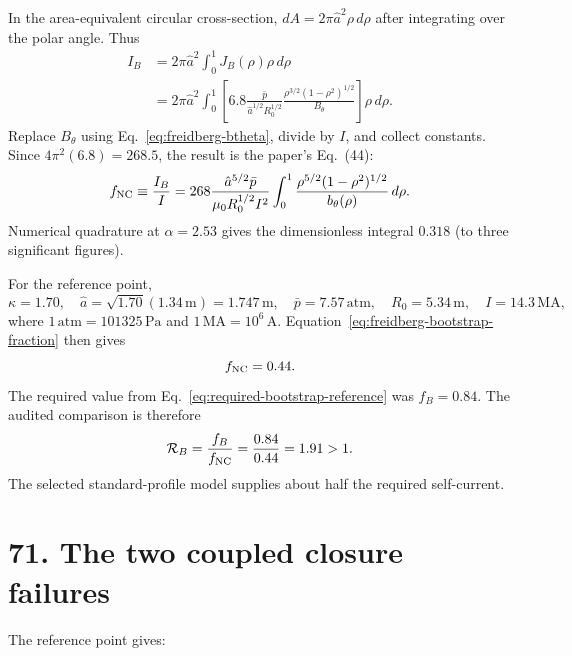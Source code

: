 \documentclass[11pt]{article}
\begin{document}
In the area-equivalent circular cross-section, $dA=2\pi\hat a^2\rho\,d\rho$ after
integrating over the polar angle. Thus
\begin{align}
 I_B&=2\pi\hat a^2\int_0^1J_B(\rho)\rho\,d\rho\\
 &=2\pi\hat a^2\int_0^1
 \left[6.8\frac{\bar p}{\hat a^{1/2}R_0^{1/2}}
 \frac{\rho^{3/2}(1-\rho^2)^{1/2}}{B_\theta}\right]\rho\,d\rho.
 \label{eq:bootstrap-area-integral}
\end{align}
Replace $B_\theta$ using Eq.~\eqref{eq:freidberg-btheta}, divide by $I$, and collect
constants. Since $4\pi^2(6.8)=268.5$, the result is the paper's Eq.~(44):
\begin{equation}
 f_{\rm NC}\equiv\frac{I_B}{I}
 =268\frac{\hat a^{5/2}\bar p}{\mu_0R_0^{1/2}I^2}
 \int_0^1\frac{\rho^{5/2}(1-\rho^2)^{1/2}}{b_\theta(\rho)}\,d\rho.
 \label{eq:freidberg-bootstrap-fraction}
\end{equation}
Numerical quadrature at $\alpha=2.53$ gives the dimensionless integral $0.318$
(to three significant figures).

For the reference point,
\begin{equation}
 \kappa=1.70,\quad \hat a=\sqrt{1.70}(1.34\,\mathrm m)=1.747\,\mathrm m,
 \quad \bar p=7.57\,\mathrm{atm},\quad R_0=5.34\,\mathrm m,\quad
 I=14.3\,\mathrm{MA},
 \label{eq:bootstrap-reference-inputs}
\end{equation}
where $1\,\mathrm{atm}=101325\,\mathrm{Pa}$ and $1\,\mathrm{MA}=10^6\,\mathrm A$.
Equation~\eqref{eq:freidberg-bootstrap-fraction} then gives
\begin{equation}
 f_{\rm NC}=0.44.
 \label{eq:bootstrap-reference-result}
\end{equation}
The required value from Eq.~\eqref{eq:required-bootstrap-reference} was $f_B=0.84$.
The audited comparison is therefore
\begin{equation}
 \mathcal R_B=\frac{f_B}{f_{\rm NC}}=\frac{0.84}{0.44}=1.91>1.
 \label{eq:bootstrap-reference-ratio}
\end{equation}
The selected standard-profile model supplies about half the required self-current.

\section*{71. The two coupled closure failures}

The reference point gives:
\end{document}
